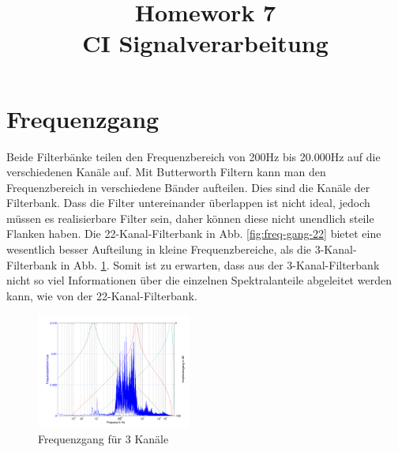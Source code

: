 \documentclass[conference]{IEEEtran}
\begin{document}
%
%
\title{Homework 7\\ CI Signalverarbeitung}

\author{
}


\maketitle

\IEEEpeerreviewmaketitle

\section{Frequenzgang}
Beide Filterbänke teilen den Frequenzbereich von 200Hz bis 20.000Hz auf die verschiedenen Kanäle auf. Mit Butterworth Filtern kann man den Frequenzbereich in verschiedene Bänder aufteilen. Dies sind die Kanäle der Filterbank. Dass die Filter untereinander überlappen ist nicht ideal, jedoch müssen es realisierbare Filter sein, daher können diese nicht unendlich steile Flanken haben. Die 22-Kanal-Filterbank in Abb. \ref{fig:freq-gang-22} bietet eine wesentlich besser Aufteilung in kleine Frequenzbereiche, als die 3-Kanal-Filterbank in Abb. \ref{fig:freq-gang-3}. Somit ist zu erwarten, dass aus der 3-Kanal-Filterbank nicht so viel Informationen über die einzelnen Spektralanteile abgeleitet werden kann, wie von der 22-Kanal-Filterbank.
\begin{figure}[h]
	\vspace{-5pt}
	\centering
	\includegraphics[width=0.45\textwidth]{img/freq_gang_3.png}
	\vspace{-10pt}
	\caption{Frequenzgang für 3 Kanäle}
	\vspace{-20pt}
	\label{fig:freq-gang-3}
\end{figure}
\end{document}
